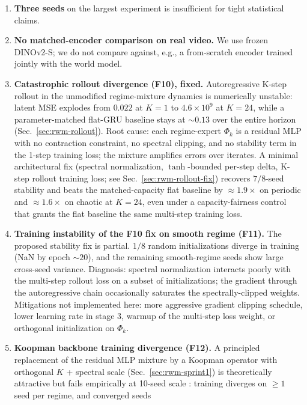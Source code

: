 \documentclass[11pt,a4paper]{article}
\begin{document}
\begin{enumerate}[label=L\arabic*., leftmargin=*]
  $0.67$ router accuracy combine in a way that suggests a
  degenerate-but-working solution at that random initialization.
\item \textbf{Three seeds} on the largest experiment is insufficient
  for tight statistical claims.
\item \textbf{No matched-encoder comparison on real video.} We use
  frozen DINOv2-S; we do not compare against, e.g., a from-scratch
  encoder trained jointly with the world model.
\item \textbf{Catastrophic rollout divergence (F10), fixed.}
  Autoregressive K-step rollout in the unmodified regime-mixture
  dynamics is numerically unstable: latent MSE explodes from $0.022$
  at $K{=}1$ to $4.6{\times}10^9$ at $K{=}24$, while a
  parameter-matched flat-GRU baseline stays at $\sim 0.13$ over the
  entire horizon (Sec.~\ref{sec:rwm-rollout}). Root cause: each
  regime-expert $\Phi_k$ is a residual MLP with no contraction
  constraint, no spectral clipping, and no stability term in the
  1-step training loss; the mixture amplifies errors over iterates.
  A minimal architectural fix (spectral normalization, $\tanh$-bounded
  per-step delta, K-step rollout training loss; see
  Sec.~\ref{sec:rwm-rollout-fix}) recovers $7/8$-seed stability and
  beats the matched-capacity flat baseline by $\approx 1.9{\times}$
  on periodic and $\approx 1.6{\times}$ on chaotic at $K{=}24$, even
  under a capacity-fairness control that grants the flat baseline the
  same multi-step training loss.
\item \textbf{Training instability of the F10 fix on smooth regime
  (F11).} The proposed stability fix is partial. $1/8$ random
  initializations diverge in training (NaN by epoch $\sim 20$), and
  the remaining smooth-regime seeds show large cross-seed variance.
  Diagnosis: spectral normalization interacts poorly with the
  multi-step rollout loss on a subset of initializations; the gradient
  through the autoregressive chain occasionally saturates the
  spectrally-clipped weights. Mitigations not implemented here:
  more aggressive gradient clipping schedule, lower learning rate in
  stage 3, warmup of the multi-step loss weight, or orthogonal
  initialization on $\Phi_k$.
\item \textbf{Koopman backbone training divergence (F12).} A
  principled replacement of the residual MLP mixture by a Koopman
  operator with orthogonal $K$ + spectral scale (Sec.~\ref{sec:rwm-sprint1})
  is theoretically attractive but fails empirically at 10-seed scale :
  training diverges on $\geq 1$ seed per regime, and converged seeds

\end{enumerate}
\end{document}
